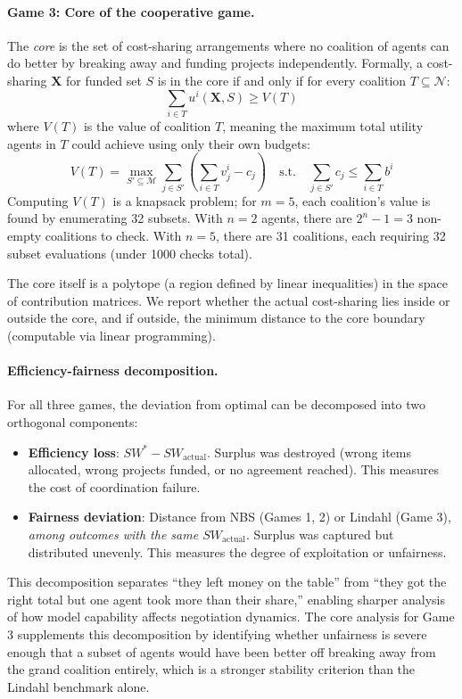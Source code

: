 \paragraph{Game 3: Core of the cooperative game.}
The \emph{core} is the set of cost-sharing arrangements where no coalition of agents can do better by breaking away and funding projects independently.
Formally, a cost-sharing $\bm{X}$ for funded set $S$ is in the core if and only if for every coalition $T \subseteq \mathcal{N}$:
\begin{equation}
    \sum_{i \in T} u^i(\bm{X}, S) \geq V(T)
\end{equation}
where $V(T)$ is the value of coalition $T$, meaning the maximum total utility agents in $T$ could achieve using only their own budgets:
\begin{equation}
    V(T) = \max_{S' \subseteq \mathcal{M}} \sum_{j \in S'} \left(\sum_{i \in T} v^i_j - c_j\right) \quad \text{s.t.} \quad \sum_{j \in S'} c_j \leq \sum_{i \in T} b^i
\end{equation}
Computing $V(T)$ is a knapsack problem; for $m=5$, each coalition's value is found by enumerating 32 subsets.
With $n=2$ agents, there are $2^n - 1 = 3$ non-empty coalitions to check.
With $n=5$, there are 31 coalitions, each requiring 32 subset evaluations (under 1000 checks total).

The core itself is a polytope (a region defined by linear inequalities) in the space of contribution matrices.
We report whether the actual cost-sharing lies inside or outside the core, and if outside, the minimum distance to the core boundary (computable via linear programming).

\paragraph{Efficiency-fairness decomposition.}
For all three games, the deviation from optimal can be decomposed into two orthogonal components:
\begin{itemize}
    \item \textbf{Efficiency loss}: $SW^* - SW_{\text{actual}}$. Surplus was destroyed (wrong items allocated, wrong projects funded, or no agreement reached). This measures the cost of coordination failure.
    \item \textbf{Fairness deviation}: Distance from NBS (Games 1, 2) or Lindahl (Game 3), \emph{among outcomes with the same $SW_{\text{actual}}$}. Surplus was captured but distributed unevenly. This measures the degree of exploitation or unfairness.
\end{itemize}
This decomposition separates ``they left money on the table'' from ``they got the right total but one agent took more than their share,'' enabling sharper analysis of how model capability affects negotiation dynamics.
The core analysis for Game 3 supplements this decomposition by identifying whether unfairness is severe enough that a subset of agents would have been better off breaking away from the grand coalition entirely, which is a stronger stability criterion than the Lindahl benchmark alone.
